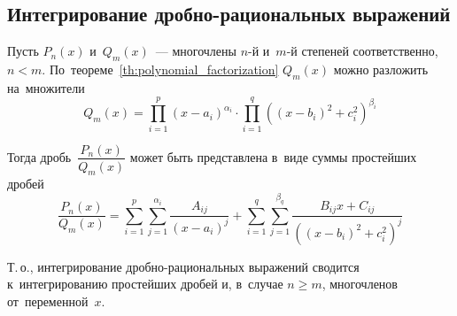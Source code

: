 \subsection{Интегрирование дробно-рациональных выражений}
Пусть $P_n(x)$ и~$Q_m(x)$~--- многочлены $n$\nobreakdash-й и~$m$\nobreakdash-й степеней соответственно, $n < m$.
По~теореме~\ref{th:polynomial_factorization} $Q_m(x)$ можно разложить на~множители
\begin{equation*}
Q_m(x) = \prod_{i=1}^{p} (x - a_i)^{\alpha_i} \cdot \prod_{i=1}^{q} ((x - b_i)^2 + c_i^2)^{\beta_i}
\end{equation*}

Тогда дробь~$\dfrac{P_n(x)}{Q_m(x)}$ может быть представлена в~виде суммы простейших дробей
\begin{equation*}
\frac{P_n(x)}{Q_m(x)} = \sum_{i=1}^p \sum_{j=1}^{\alpha_i} \frac{A_{ij}}{(x - a_i)^j} + \sum_{i=1}^q \sum_{j=1}^{\beta_q} \frac{B_{ij}x + C_{ij}}{((x - b_i)^2 + c_i^2)^j}
\end{equation*}

Т.\,о., интегрирование дробно-рациональных выражений сводится к~интегрированию простейших дробей и, в~случае $n \geqslant m$, многочленов от~переменной~$x$.